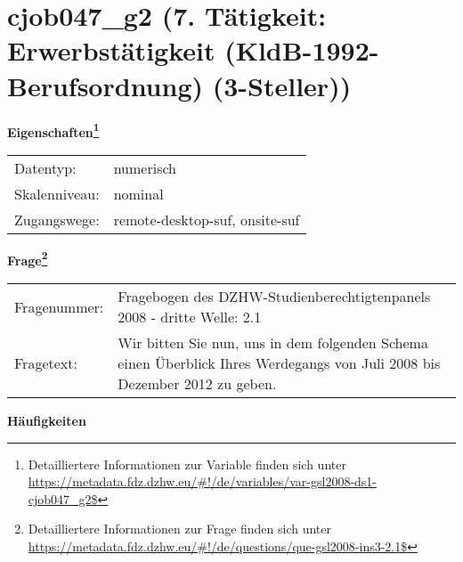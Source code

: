 
    \setcounter{footnote}{0}

    \vspace*{-1.8cm}
	\section{cjob047\_g2 (7. Tätigkeit: Erwerbstätigkeit (KldB-1992-Berufsordnung) (3-Steller))}
	\label{section:cjob047_g2}



    \vspace*{0.5cm}
    \noindent\textbf{Eigenschaften\footnote{Detailliertere Informationen zur Variable finden sich unter
		\url{https://metadata.fdz.dzhw.eu/\#!/de/variables/var-gsl2008-ds1-cjob047_g2$}}}\\
	\begin{tabularx}{\hsize}{@{}lX}
	Datentyp: & numerisch \\
	Skalenniveau: & nominal \\
	Zugangswege: &
	  remote-desktop-suf, 
	  onsite-suf
 \\
    \end{tabularx}



				\vspace*{0.5cm}
                \noindent\textbf{Frage\footnote{Detailliertere Informationen zur Frage finden sich unter
		              \url{https://metadata.fdz.dzhw.eu/\#!/de/questions/que-gsl2008-ins3-2.1$}}}\\
				\begin{tabularx}{\hsize}{@{}lX}
					Fragenummer: &
					  Fragebogen des DZHW-Studienberechtigtenpanels 2008 - dritte Welle:
					  2.1
 \\
					Fragetext: & Wir bitten Sie nun, uns in dem folgenden Schema einen Überblick Ihres Werdegangs von Juli 2008 bis Dezember 2012 zu geben. \\
				\end{tabularx}





        		\vspace*{0.5cm}
                \noindent\textbf{Häufigkeiten}

